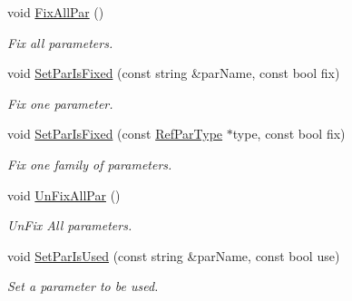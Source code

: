 \begin{DoxyCompactItemize}
void \mbox{\hyperlink{class_obj_cryst_1_1_optimization_obj_af8b3cef84c6bcca37cdc4bfde9ecde45}{Fix\+All\+Par}} ()
\begin{DoxyCompactList}\small\item\em Fix all parameters. \end{DoxyCompactList}\item 
\mbox{\label{class_obj_cryst_1_1_optimization_obj_aca3e1d2c6ace92f1a3a67da2455eac39}} 
void \mbox{\hyperlink{class_obj_cryst_1_1_optimization_obj_aca3e1d2c6ace92f1a3a67da2455eac39}{Set\+Par\+Is\+Fixed}} (const string \&par\+Name, const bool fix)
\begin{DoxyCompactList}\small\item\em Fix one parameter. \end{DoxyCompactList}\item 
\mbox{\label{class_obj_cryst_1_1_optimization_obj_a12a66416a701cbf0db17de3bfafdec99}} 
void \mbox{\hyperlink{class_obj_cryst_1_1_optimization_obj_a12a66416a701cbf0db17de3bfafdec99}{Set\+Par\+Is\+Fixed}} (const \mbox{\hyperlink{class_obj_cryst_1_1_ref_par_type}{Ref\+Par\+Type}} $\ast$type, const bool fix)
\begin{DoxyCompactList}\small\item\em Fix one family of parameters. \end{DoxyCompactList}\item 
\mbox{\label{class_obj_cryst_1_1_optimization_obj_adb016adacaa7a2a15e40cfb746705bdd}} 
void \mbox{\hyperlink{class_obj_cryst_1_1_optimization_obj_adb016adacaa7a2a15e40cfb746705bdd}{Un\+Fix\+All\+Par}} ()
\begin{DoxyCompactList}\small\item\em Un\+Fix All parameters. \end{DoxyCompactList}\item 
\mbox{\label{class_obj_cryst_1_1_optimization_obj_ab2f87becfb73eb00d8f7c3ff25435c0d}} 
void \mbox{\hyperlink{class_obj_cryst_1_1_optimization_obj_ab2f87becfb73eb00d8f7c3ff25435c0d}{Set\+Par\+Is\+Used}} (const string \&par\+Name, const bool use)
\begin{DoxyCompactList}\small\item\em Set a parameter to be used. \end{DoxyCompactList}\item 

\end{DoxyCompactItemize}
